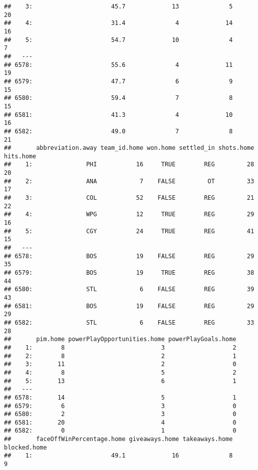 \documentclass[
]{article}
\begin{document}
\begin{verbatim}
##    3:                      45.7             13              5           20
##    4:                      31.4              4             14           16
##    5:                      54.7             10              4            7
##   ---                                                                     
## 6578:                      55.6              4             11           19
## 6579:                      47.7              6              9           15
## 6580:                      59.4              7              8           15
## 6581:                      41.3              4             10           16
## 6582:                      49.0              7              8           21
##       abbreviation.away team_id.home won.home settled_in shots.home hits.home
##    1:               PHI           16     TRUE        REG         28        20
##    2:               ANA            7    FALSE         OT         33        17
##    3:               COL           52    FALSE        REG         21        22
##    4:               WPG           12     TRUE        REG         29        16
##    5:               CGY           24     TRUE        REG         41        15
##   ---                                                                        
## 6578:               BOS           19    FALSE        REG         29        35
## 6579:               BOS           19     TRUE        REG         38        44
## 6580:               STL            6    FALSE        REG         39        43
## 6581:               BOS           19    FALSE        REG         29        29
## 6582:               STL            6    FALSE        REG         33        28
##       pim.home powerPlayOpportunities.home powerPlayGoals.home
##    1:        8                           3                   2
##    2:        8                           2                   1
##    3:       11                           2                   0
##    4:        8                           5                   2
##    5:       13                           6                   1
##   ---                                                         
## 6578:       14                           5                   1
## 6579:        6                           3                   0
## 6580:        2                           3                   0
## 6581:       20                           4                   0
## 6582:        0                           1                   0
##       faceOffWinPercentage.home giveaways.home takeaways.home blocked.home
##    1:                      49.1             16              8            9

\end{verbatim}
\end{document}
